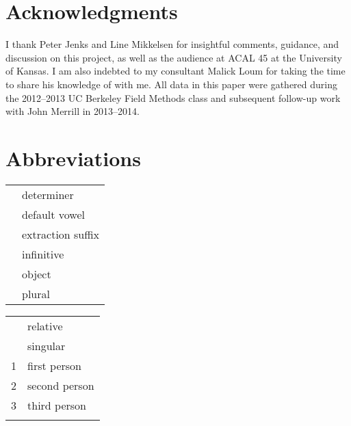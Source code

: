 \documentclass[output=paper,
modfonts
]{langscibook}
\begin{document}
\section*{Acknowledgments}
I thank Peter Jenks and Line Mikkelsen for insightful comments, guidance, and discussion on this project, as well as the audience at ACAL 45 at the University of Kansas. I am also indebted to my consultant Malick Loum for taking the time to share his knowledge of  with me. All data in this paper were gathered during the 2012--2013 UC Berkeley Field Methods class and subsequent follow-up work with John Merrill in 2013--2014. 


\section*{Abbreviations}
\begin{tabularx}{.45\textwidth}{lQ}
 \Det{} & determiner\\
 \Dv{} & default vowel\\
 \Ext{} &  {extraction} suffix\\
 \Inf{} &  {infinitive}\\
 \Obj{} & object\\
 \Pl{} & plural\\
 \end{tabularx}
\begin{tabularx}{.45\textwidth}{lQ}
 \Rel{} & relative\\
 \Sg{} & singular\\
 1 & first person\\
 2 & second person\\
 3 & third person\\
 \\
 \end{tabularx}




{\sloppy
\printbibliography[heading=subbibliography,notkeyword=this]
}
\end{document}
